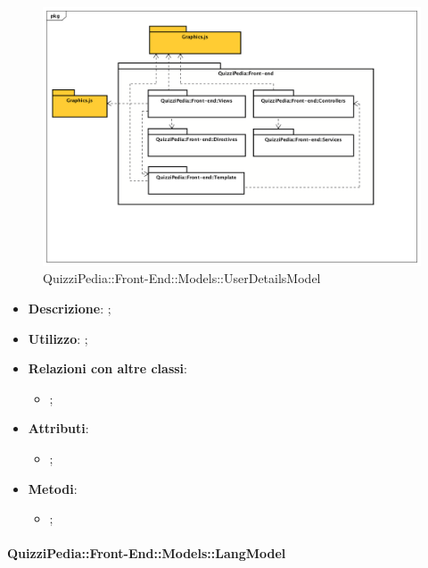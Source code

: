			\label{QuizziPedia::Front-End::Models:.UserDetailsModel}
			
			\begin{figure}[h]
				\centering
				\includegraphics[scale=0.5,keepaspectratio]{UML/Package/QuizziPedia_Front-end.png}
				\caption{QuizziPedia::Front-End::Models::UserDetailsModel}
			\end{figure}
			
			\begin{itemize}
				\item \textbf{Descrizione}: ;
				\item \textbf{Utilizzo}: ;
				\item \textbf{Relazioni con altre classi}: 
				\begin{itemize}
					\item ;
				\end{itemize}
				\item \textbf{Attributi}: 
				\begin{itemize}
					\item ;
				\end{itemize}
				\item \textbf{Metodi}: 
				\begin{itemize}
					\item ;
				\end{itemize}
			\end{itemize}
		
		\paragraph{QuizziPedia::Front-End::Models::LangModel}
		
			\label{QuizziPedia::Front-End::Models::LangModel}
			
